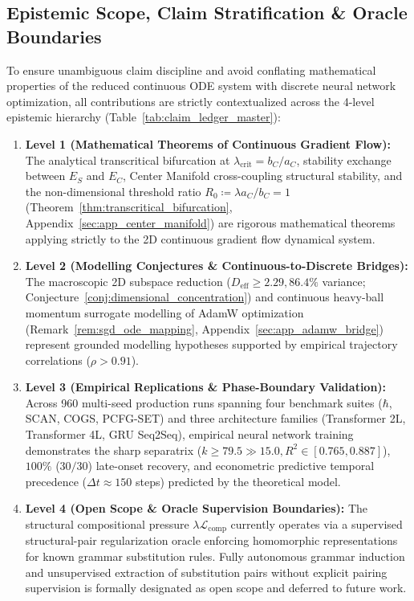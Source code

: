 \documentclass{article}
\theoremstyle{plain}
\theoremstyle{definition}
\begin{document}
\subsection{Epistemic Scope, Claim Stratification \& Oracle Boundaries}
\label{sec:epistemic_scope_oracle}
To ensure unambiguous claim discipline and avoid conflating mathematical properties of the reduced continuous ODE system with discrete neural network optimization, all contributions are strictly contextualized across the 4-level epistemic hierarchy (Table~\ref{tab:claim_ledger_master}):
\begin{enumerate}[leftmargin=*,noitemsep]
    \item \textbf{Level 1 (Mathematical Theorems of Continuous Gradient Flow):} The analytical transcritical bifurcation at $\lambda_{\text{crit}} = b_C / a_C$, stability exchange between $E_S$ and $E_C$, Center Manifold cross-coupling structural stability, and the non-dimensional threshold ratio $R_0 \coloneqq \lambda a_C / b_C = 1$ (Theorem~\ref{thm:transcritical_bifurcation}, Appendix~\ref{sec:app_center_manifold}) are rigorous mathematical theorems applying strictly to the 2D continuous gradient flow dynamical system.
    \item \textbf{Level 2 (Modelling Conjectures \& Continuous-to-Discrete Bridges):} The macroscopic 2D subspace reduction ($D_{\text{eff}} \ge 2.29, 86.4\%$ variance; Conjecture~\ref{conj:dimensional_concentration}) and continuous heavy-ball momentum surrogate modelling of AdamW optimization (Remark~\ref{rem:sgd_ode_mapping}, Appendix~\ref{sec:app_adamw_bridge}) represent grounded modelling hypotheses supported by empirical trajectory correlations ($\rho > 0.91$).
    \item \textbf{Level 3 (Empirical Replications \& Phase-Boundary Validation):} Across 960 multi-seed production runs spanning four benchmark suites ($\hbar$, SCAN, COGS, PCFG-SET) and three architecture families (Transformer 2L, Transformer 4L, GRU Seq2Seq), empirical neural network training demonstrates the sharp separatrix ($k \ge 79.5 \gg 15.0, R^2 \in [0.765, 0.887]$), $100\%$ ($30/30$) late-onset recovery, and econometric predictive temporal precedence ($\Delta t \approx 150$ steps) predicted by the theoretical model.
    \item \textbf{Level 4 (Open Scope \& Oracle Supervision Boundaries):} The structural compositional pressure $\lambda \mathcal{L}_{\text{comp}}$ currently operates via a supervised structural-pair regularization oracle enforcing homomorphic representations for known grammar substitution rules. Fully autonomous grammar induction and unsupervised extraction of substitution pairs without explicit pairing supervision is formally designated as open scope and deferred to future work.
\end{enumerate}
\end{document}
